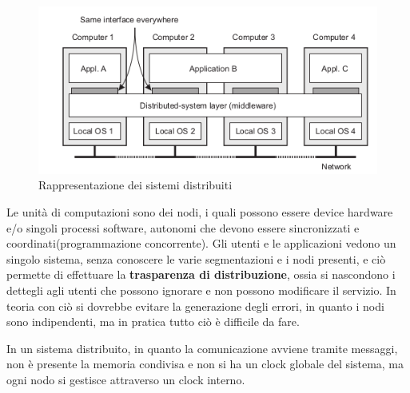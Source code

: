 \message{ !name(sd.tex)}\documentclass[a4paper,12pt, oneside]{book}
\begin{document}
\begin{figure}
    \caption{Rappresentazione dei sistemi distribuiti}
	\includegraphics[scale=2.5]{img/cli.png}
\end{figure}
Le unità di computazioni sono dei nodi, i quali possono essere device hardware e/o singoli processi software,
autonomi che devono essere sincronizzati e coordinati(programmazione concorrente).\newline
Gli utenti e le applicazioni vedono un singolo sistema, senza conoscere le varie segmentazioni 
e i nodi presenti, e ciò permette di effettuare la \textbf{trasparenza di distribuzione}, 
ossia si nascondono i dettegli agli utenti che possono ignorare e non possono modificare il servizio.\newline 
In teoria con ciò si dovrebbe evitare la generazione degli errori, in quanto i nodi sono
indipendenti, ma in pratica tutto ciò è difficile da fare.

In un sistema distribuito, in quanto la comunicazione avviene tramite messaggi, non è presente la memoria
condivisa e non si ha un clock globale del sistema, ma ogni nodo si gestisce attraverso un clock interno.
\end{document}
